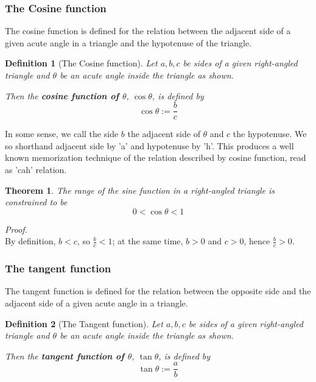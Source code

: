 \documentclass[12pt]{article}
\newtheorem{definition}{Definition}[section]
\newtheorem*{theorem}{Theorem}
\renewenvironment{proof}[1][Proof]{\begin{snugshade*} \textit{{#1}.}\\}{\hfill \qedsymbol \end{snugshade*}}
\begin{document}
    \subsubsection*{The Cosine function}

    The cosine function is defined for the relation between the adjacent side of a given acute angle in a triangle and the hypotenuse of the triangle.

    \begin{definition}[The Cosine function]
        Let $a,b,c$ be sides of a given right-angled triangle and $\theta$ be an acute angle inside the triangle as shown.

        Then the \textbf{cosine function of $\theta$}, $\cos{\theta}$, is defined by $$\cos{\theta}:=\frac{b}{c}$$
    \end{definition}

    In some sense, we call the side $b$ the adjacent side of $\theta$ and $c$ the hypotenuse. We so shorthand adjacent side by 'a' and hypotenuse by 'h'. This produces a well known memorization technique of the relation described by cosine function, read as 'cah' relation.

    \begin{theorem}
        The range of the sine function in a right-angled triangle is constrained to be $$0<\cos{\theta}<1$$
    \end{theorem}

    \begin{proof}
        By definition, $b<c$, so $\frac{b}{c}<1$; at the same time, $b>0$ and $c>0$, hence $\frac{b}{c}>0$.
    \end{proof}

    \subsubsection*{The tangent function}

    The tangent function is defined for the relation between the opposite side and the adjacent side of a given acute angle in a triangle.

    \begin{definition}[The Tangent function]
        Let $a,b,c$ be sides of a given right-angled triangle and $\theta$ be an acute angle inside the triangle as shown.

        Then the \textbf{tangent function of $\theta$}, $\tan{\theta}$, is defined by $$\tan{\theta}:=\frac{a}{b}$$
    \end{definition}
\end{document}
